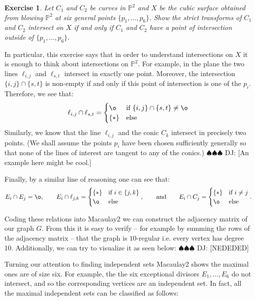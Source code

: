\documentclass[11pt]{amsart}
\newtheorem{ex}[lemma]{Exercise}
\theoremstyle{remark}
\renewcommand{\P}{\mathbb{P}}
\newcommand{\deej}[1]{{\color{red} \sf $\spadesuit\spadesuit\spadesuit$ DJ: [#1]}}
\begin{document}
\begin{ex}
Let $C_1$ and $C_2$ be curves in $\P^2$ and $X$ be the cubic surface obtained from blowing $\P^2$ at six general points $\{p_1,\ldots,p_6\}$. Show the strict transforms of $C_1$ and $C_2$ intersect on $X$ if and only if $C_1$ and $C_2$ have a point of intersection outside of $\{p_1,\ldots,p_6\}$.
\end{ex}

In particular, this exercise says that in order to understand intersections on $X$ it is enough to think about intersections on $\P^2$. For example, in the plane the two lines $\ell_{i,j}$ and $\ell_{s,t}$ intersect in exactly one point. Moreover, the intersection $\{i,j\}\cap \{s,t\}$ is non-empty if and only if this point of intersection is one of the $p_i$. Therefore, we see that:
\[
\ell_{i,j}\cap \ell_{s,t}=\begin{cases} \o &\mbox{if } \{i,j\}\cap\{s,t\}\neq\o \\ 
\{*\} & \mbox{else }  \end{cases} 
\]
Similarly, we know that the line $\ell_{i,j}$ and the conic $C_{k}$ intersect in precisely two points. (We shall assume the points $p_i$ have been chosen sufficiently generally so that none of the lines of interest are tangent to any of the conics.) \deej{An example here might be cool.}

Finally, by a similar line of reasoning one can see that:
\[
E_i\cap E_j=\o, \quad\quad E_i\cap \ell_{j,k}=\begin{cases} \{*\} &\mbox{if } i\in \{j,k\} \\ 
\o & \mbox{else }  \end{cases}, \quad \quad \text{and} \quad \quad E_i\cap C_j=\begin{cases} \{*\} &\mbox{if } i\neq j \\ 
\o & \mbox{else }  \end{cases}.
\]

Coding these relations into Macaulay2 we can construct the adjacency matrix of our graph $G$. From this it is easy to verify -- for example by summing the rows of the adjacency matrix -- that the graph is $10$-regular i.e. every vertex has degree 10. Additionally, we can try to visualize it as seen below:
\deej{NEDEDED}

Turning our attention to finding independent sets Macaulay2 shows the maximal ones are of size six. For example, the the six exceptional divisors $E_1,\ldots,E_6$ do not intersect, and so the corresponding vertices are an independent set. In fact, all the maximal independent sets can be classified as follows:
\end{document}
